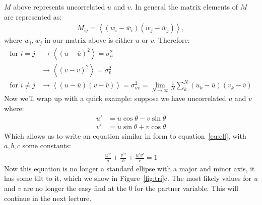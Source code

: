 \documentclass{article}
\begin{document}
$M$ above represents uncorrelated $u$ and $v$. In general the matrix elements of $M$ are represented as:
\begin{align}
  M_{ij} = \left\langle\left(w_i - \overline{w}_i\right)\left(w_j-\overline{w}_j\right)\right\rangle,
\end{align}
where $w_i,w_j$ in our matrix above is either $u$ or $v$. Therefore:
\begin{align*}
  \text{for } i = j        & \rightarrow \left\langle(u-\overline{u})^2\right\rangle = \sigma_u^2 \\
                           & \rightarrow \left\langle(v-\overline{v})^2\right\rangle = \sigma_v^2 \\
  \text{for } i \neq j     & \rightarrow \left\langle(u-\overline{u})(v-\overline{v})\right\rangle = \sigma_{uv}^2 =
  \lim_{N\rightarrow\infty}\frac{1}{N}\sum_k^N\left(u_k - \overline{u}\right)\left(v_k - \overline{v}\right)
\end{align*}
Now we'll wrap up with a quick example: suppose we have uncorrelated $u$ and $v$ where:
\begin{align*}
  u'                       & = u\cos\theta - v\sin\theta                                          \\
  v'                       & = u\sin\theta + v\cos\theta
\end{align*}
Which allows us to write an equation similar in form to equation~\ref{eq:ell}, with $a,b,c$ some constants:
\begin{align*}
  \frac{u^{\prime 2}}{a} + \frac{v^{\prime2}}{b} + \frac{u'v'}{c} = 1
\end{align*}
Now this equation is no longer a standard ellipse with a major and minor axis, it has some tilt to it, which we show in Figure~\ref{fig:tri}c. The most likely values for $u$ and $v$ are no longer the easy find at the $0$ for the partner variable. This will continue in the next lecture.
\end{document}
